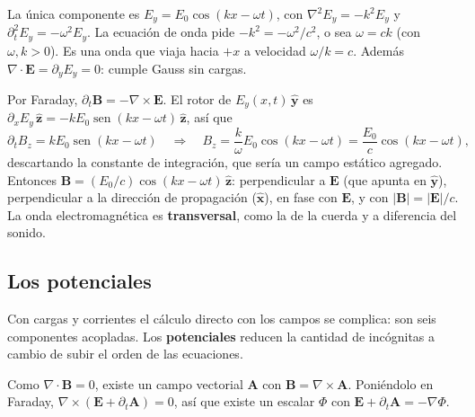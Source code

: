 \documentclass[
  spanish,
  a4paper,
]{scrbook}
\theoremstyle{definition}
\theoremstyle{plain}
\theoremstyle{definition}
\theoremstyle{plain}
\theoremstyle{definition}
\theoremstyle{remark}
\begin{document}
\begin{tcolorbox}[enhanced jigsaw, arc=.35mm, bottomrule=.15mm, bottomtitle=1mm, breakable, colback=white, colbacktitle=quarto-callout-tip-color!10!white, colframe=quarto-callout-tip-color-frame, coltitle=black, left=2mm, leftrule=.75mm, opacityback=0, opacitybacktitle=0.6, rightrule=.15mm, title=\textcolor{quarto-callout-tip-color}{\faLightbulb}\hspace{0.5em}{Solución}, titlerule=0mm, toprule=.15mm, toptitle=1mm]

La única componente es \(E_y = E_0\cos(kx-\omega t)\), con
\(\nabla^2E_y = -k^2E_y\) y \(\partial_t^2E_y = -\omega^2E_y\). La
ecuación de onda pide \(-k^2 = -\omega^2/c^2\), o sea \(\omega = ck\)
(con \(\omega,k>0\)). Es una onda que viaja hacia \(+x\) a velocidad
\(\omega/k = c\). Además \(\nabla\cdot\mathbf E = \partial_yE_y = 0\):
cumple Gauss sin cargas.

Por Faraday, \(\partial_t\mathbf B = -\nabla\times\mathbf E\). El rotor
de \(E_y(x,t)\,\hat{\mathbf y}\) es
\(\partial_xE_y\,\hat{\mathbf z} = -kE_0\operatorname{sen}(kx-\omega t)\,\hat{\mathbf z}\),
así que \[
\partial_t B_z = kE_0\operatorname{sen}(kx-\omega t)\quad\Longrightarrow\quad
B_z = \frac{k}{\omega}E_0\cos(kx-\omega t) = \frac{E_0}{c}\cos(kx-\omega t),
\] descartando la constante de integración, que sería un campo estático
agregado. Entonces
\(\mathbf B = (E_0/c)\cos(kx-\omega t)\,\hat{\mathbf z}\): perpendicular
a \(\mathbf E\) (que apunta en \(\hat{\mathbf y}\)), perpendicular a la
dirección de propagación (\(\hat{\mathbf x}\)), en fase con
\(\mathbf E\), y con \(|\mathbf B| = |\mathbf E|/c\). La onda
electromagnética es \textbf{transversal}, como la de la cuerda y a
diferencia del sonido.

\end{tcolorbox}

\subsection{Los potenciales}\label{sec-hip-potenciales}

Con cargas y corrientes el cálculo directo con los campos se complica:
son seis componentes acopladas. Los \textbf{potenciales} reducen la
cantidad de incógnitas a cambio de subir el orden de las ecuaciones.

Como \(\nabla\cdot\mathbf B = 0\), existe un campo vectorial
\(\mathbf A\) con \(\mathbf B = \nabla\times\mathbf A\). Poniéndolo en
Faraday, \(\nabla\times(\mathbf E + \partial_t\mathbf A) = 0\), así que
existe un escalar \(\Phi\) con
\(\mathbf E + \partial_t\mathbf A = -\nabla\Phi\).
\end{document}
